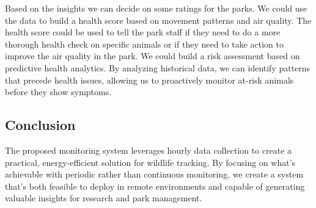 Based on the insights we can decide on some ratings for the parks. We could use the data to build a health score based on movement patterns and air quality. The health score could be used to tell the park staff if they need to do a more thorough health check on specific animals or if they need to take action to improve the air quality in the park. 
We could build a risk assessment based on predictive health analytics. By analyzing historical data, we can identify patterns that precede health issues, allowing us to proactively monitor at-risk animals before they show symptoms.

\subsection{Conclusion}
The proposed monitoring system leverages hourly data collection to create a practical, energy-efficient solution for wildlife tracking. By focusing on what's achievable with periodic rather than continuous monitoring, we create a system that's both feasible to deploy in remote environments and capable of generating valuable insights for research and park management.

